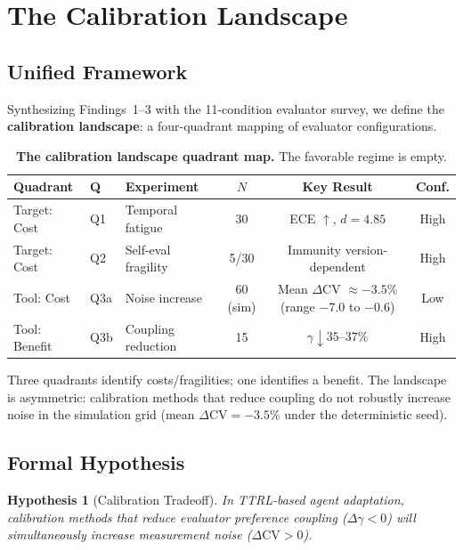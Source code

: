 \documentclass[11pt]{article}
\newcommand{\CV}{\ensuremath{\mathrm{CV}}}
\newtheorem{hypothesis}{Hypothesis}
\theoremstyle{definition}
\theoremstyle{remark}
\begin{document}
\section{The Calibration Landscape}

\subsection{Unified Framework}

Synthesizing Findings~1--3 with the 11-condition evaluator survey, we define the \textbf{calibration landscape}: a four-quadrant mapping of evaluator configurations.

\begin{table}[H]
\centering
\caption{\textbf{The calibration landscape quadrant map.} The favorable regime is empty.}
\begin{tabular}{@{}lllccc@{}}
\toprule
Quadrant & Q & Experiment & $N$ & Key Result & Conf. \\
\midrule
Target: Cost & Q1 & Temporal fatigue & 30 & ECE $\uparrow$, $d{=}4.85$ & High \\
Target: Cost & Q2 & Self-eval fragility & 5/30 & Immunity version-dependent & High \\
Tool: Cost & Q3a & Noise increase & 60 (sim) & Mean $\Delta$CV $\approx -3.5$\% (range $-7.0$ to $-0.6$) & Low \\
Tool: Benefit & Q3b & Coupling reduction & 15 & $\gamma \downarrow 35$--$37\%$ & High \\
\bottomrule
\end{tabular}
\end{table}

Three quadrants identify costs/fragilities; one identifies a benefit. The landscape is asymmetric: calibration methods that reduce coupling do not robustly increase noise in the simulation grid (mean $\Delta\CV = -3.5\%$ under the deterministic seed).

\subsection{Formal Hypothesis}

\begin{hypothesis}[Calibration Tradeoff]\label{hyp:tradeoff}
In TTRL-based agent adaptation, calibration methods that reduce evaluator preference coupling ($\Delta\gamma < 0$) will simultaneously increase measurement noise ($\Delta\CV > 0$).
\end{hypothesis}
\end{document}
